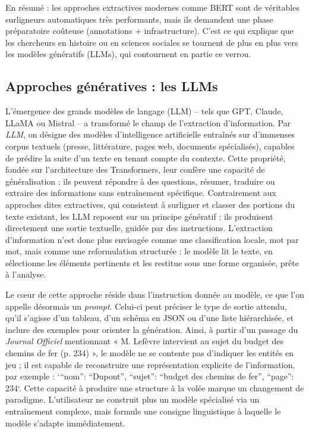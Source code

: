 En résumé : les approches extractives modernes comme BERT sont de véritables surligneurs automatiques très performants, mais ils demandent une phase préparatoire coûteuse (annotations + infrastructure). C’est ce qui explique que les chercheurs en histoire ou en sciences sociales se tournent de plus en plus vers les modèles génératifs (LLMs), qui contournent en partie ce verrou.

\subsection{Approches génératives : les LLMs}

L’émergence des grands modèles de langage (LLM) -- tels que GPT, Claude, LLaMA ou Mistral – a transformé le champ de l’extraction d’information. Par \emph{LLM}, on désigne des modèles d’intelligence artificielle entraînés sur d’immenses corpus textuels (presse, littérature, pages web, documents spécialisés), capables de prédire la suite d’un texte en tenant compte du contexte. Cette propriété, fondée sur l’architecture des Transformers, leur confère une capacité de généralisation : ils peuvent répondre à des questions, résumer, traduire ou extraire des informations sans entraînement spécifique. Contrairement aux approches dites extractives, qui consistent à surligner et classer des portions du texte existant, les LLM reposent sur un principe génératif : ils produisent directement une sortie textuelle, guidée par des instructions. L’extraction d’information n’est donc plus envisagée comme une classification locale, mot par mot, mais comme une reformulation structurée : le modèle lit le texte, en sélectionne les éléments pertinents et les restitue sous une forme organisée, prête à l’analyse.

Le cœur de cette approche réside dans l’instruction donnée au modèle, ce que l’on appelle désormais un \emph{prompt}. Celui-ci peut préciser le type de sortie attendu, qu’il s’agisse d’un tableau, d’un schéma en JSON ou d’une liste hiérarchisée, et inclure des exemples pour orienter la génération. Ainsi, à partir d’un passage du \emph{Journal Officiel} mentionnant « M. Lefèvre intervient au sujet du budget des chemins de fer (p. 234) », le modèle ne se contente pas d’indiquer les entités en jeu ; il est capable de reconstruire une représentation explicite de l’information, par exemple : `{\enquote{nom}: \enquote{Dupont}, \enquote{sujet}: \enquote{budget des chemins de fer}, \enquote{page}: 234}`. Cette capacité à produire une structure à la volée marque un changement de paradigme. L’utilisateur ne construit plus un modèle spécialisé via un entraînement complexe, mais formule une consigne linguistique à laquelle le modèle s’adapte immédiatement.

